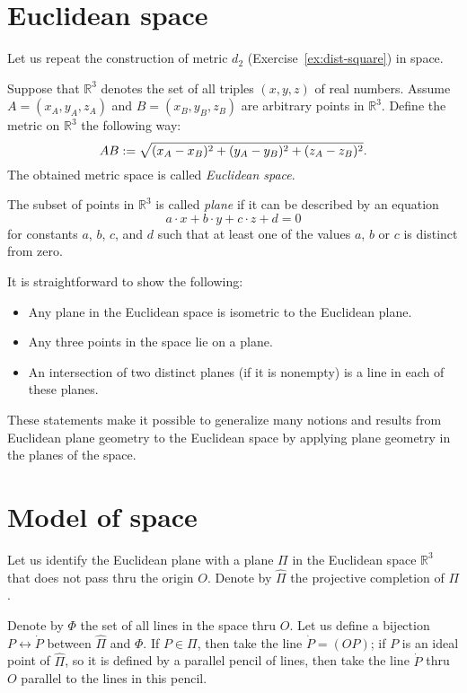 \section{Euclidean space}

Let us repeat the construction of metric $d_2$ (Exercise~\ref{ex:dist-square}) in space.

Suppose that $\mathbb{R}^3$ denotes the set of all triples $(x,y,z)$ of real numbers.
Assume $A=(x_A,y_A,z_A)$ and $B=(x_B,y_B,z_B)$ are arbitrary points in $\mathbb{R}^3$.
Define the metric on $\mathbb{R}^3$ the following way:
$$AB
:=
\sqrt{(x_A-x_B)^2+(y_A-y_B)^2+(z_A-z_B)^2}.$$
The obtained metric space is called \emph{Euclidean space}.

The subset of points in $\mathbb{R}^3$ is called \emph{plane} if it can be
described by an equation
$$a\cdot x+b\cdot y+c\cdot z+d=0$$ 
for constants $a$, $b$, $c$, and $d$ such that at least one of the values $a$, $b$ or $c$ is distinct from zero.

It is straightforward to show the following:
\begin{itemize}
 \item Any plane in the Euclidean space is isometric to the Euclidean plane.
 \item Any three points in the space lie on a plane.
 \item An intersection of two distinct planes (if it is nonempty) is a line in each of these planes.
\end{itemize}

These statements make it possible to generalize many notions and results from Euclidean plane geometry to the Euclidean space
by applying plane geometry in the planes of the space.

\section{Model of space}

Let us identify the Euclidean plane with a plane $\Pi$ in the Euclidean space $\mathbb{R}^3$ that does not pass thru the origin $O$.
Denote by $\hat\Pi$ the projective completion of $\Pi$.

Denote by $\Phi$ the set of all lines in the space thru $O$.
Let us define a bijection $P\leftrightarrow \dot P$ between $\hat \Pi$ and $\Phi$.
If $P\in \Pi$, then take the line $\dot P=(OP)$;
if $P$ is an ideal point of $\hat \Pi$, so it is defined by a parallel pencil of lines, then take the line $\dot P$ thru $O$ parallel to the lines in this pencil.

